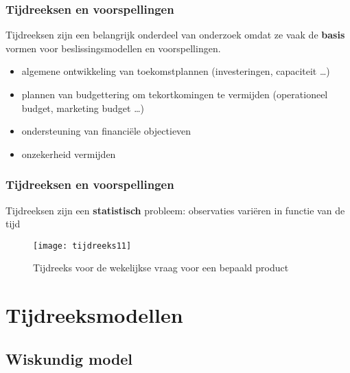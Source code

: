 \documentclass[aspectratio=169]{beamer}
\begin{document}
\begin{frame}
  \frametitle{Tijdreeksen en voorspellingen}
  
  Tijdreeksen zijn een belangrijk onderdeel van onderzoek omdat ze vaak de \textbf{basis} vormen voor beslissingsmodellen en voorspellingen.
  
  \begin{itemize}
    \item algemene ontwikkeling van toekomstplannen (investeringen, capaciteit \dots)
    \item plannen van budgettering om tekortkomingen te vermijden (operationeel budget, marketing budget \dots)
    \item ondersteuning van financi\"ele objectieven
    \item onzekerheid vermijden
  \end{itemize}
\end{frame}

\begin{frame}[plain]
  \frametitle{Tijdreeksen en voorspellingen}
  
  Tijdreeksen zijn een \textbf{statistisch} probleem: observaties variëren in functie van de tijd
  
  \begin{figure}
    \centering
    \texttt{[image: tijdreeks11]}
    \caption{Tijdreeks voor de wekelijkse vraag voor een bepaald product}
  \end{figure}
\end{frame}

\section{Tijdreeksmodellen}

\subsection{Wiskundig model}
\end{document}
